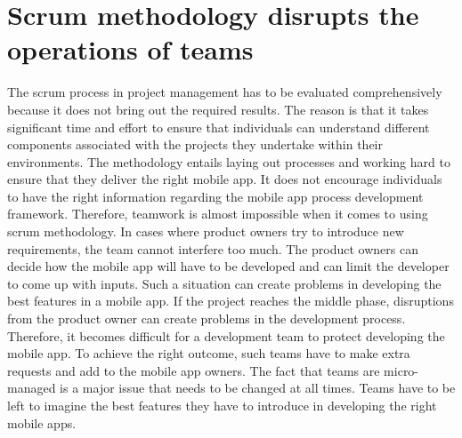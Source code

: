 \documentclass{article}
\begin{document}
\section*{Scrum methodology disrupts the operations of teams}
The scrum process in project management has to be evaluated comprehensively because it does not bring out the required results. The reason is that it takes significant time and effort to ensure that individuals can understand different components associated with the projects they undertake within their environments. The methodology entails laying out processes and working hard to ensure that they deliver the right mobile app. It does not encourage individuals to have the right information regarding the mobile app process development framework. Therefore, teamwork is almost impossible when it comes to using scrum methodology. In cases where product owners try to introduce new requirements, the team cannot interfere too much. The product owners can decide how the mobile app will have to be developed and can limit the developer to come up with inputs. Such a situation can create problems in developing the best features in a mobile app. If the project reaches the middle phase, disruptions from the product owner can create problems in the development process. Therefore, it becomes difficult for a development team to protect developing the mobile app\cite{Bhavsar_ScrumReference}. To achieve the right outcome, such teams have to make extra requests and add to the mobile app owners. The fact that teams are micro-managed is a major issue that needs to be changed at all times. Teams have to be left to imagine the best features they have to introduce in developing the right mobile apps.
\end{document}
